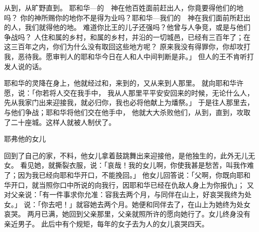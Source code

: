 {从{}到{}，从旷野直到{}。
耶和华—{}的　神在他百姓{}面前赶出{}人，你竟要得他们的地吗？
你的神{}所赐你的地你不是得为业吗？耶和华—我们的　神在我们面前所赶出的人，我们就得他的地。
难道你比{}王{}的儿子{}还强吗？他曾与{}人争竞，或是与他们争战吗？
人住{}和属{}的乡村，{}和属{}的乡村，并沿{}的一切城邑，已经有三百年了；在这三百年之内，你们为什么没有取回这些地方呢？
原来我没有得罪你，你却攻打我，恶待我。愿审判人的耶和华今日在{}人和{}人中间判断是非。」
但{}人的王不肯听{}打发人说的话。
\par }{\PP {}耶和华的灵降在{}身上，他就经过{}和{}，来到{}的{}，又从{}来到{}人那里。
就向耶和华许愿，说：「你若将{}人交在我手中，
我从{}人那里平平安安回来的时候，无论什么人，先从我家门出来迎接我，就必归你，我也必将他献上为燔祭。」
于是{}往{}人那里去，与他们争战；耶和华将他们交在他手中，
他就大大杀败他们，从{}到{}，直到{}，攻取了二十座城。这样{}人就被{}人制伏了。
\par }{\SH 耶弗他的女儿
\par }{\PP {}回{}到了自己的家，不料，他女儿拿着鼓跳舞出来迎接他，是他独生的，此外无儿无女。
看见她，就撕裂衣服，说：「哀哉！我的女儿啊，你使我甚是愁苦，叫我作难了；因为我已经向耶和华开口{}，不能挽回。」
他女儿回答说：「父啊，你既向耶和华开口，就当照你口中所说的向我行，因耶和华已经在仇敌{}人身上为你报仇」；
又对父亲说：「有一件事求你允准：容我去两个月，与同伴在山上，好哀哭我终为处女。」
说：「你去吧！」就容她去两个月。她便和同伴去了，在山上为她终为处女哀哭。
两月已满，她回到父亲那里，父亲就照所许的愿向她行了。女儿终身没有亲近男子。
此后{}中有个规矩，每年{}的女子去为{}人{}的女儿哀哭四天。

}
